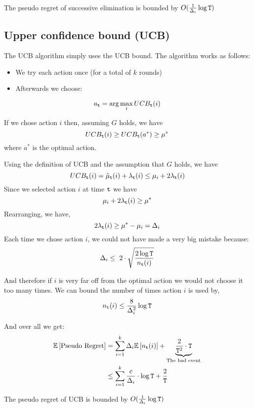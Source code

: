 \begin{theorem}
The pseudo regret of successive elimination is bounded by $O(\frac{1}{\Delta_{i}}\log {\tt T})$
\end{theorem}

\subsection{Upper confidence bound (UCB)}

The UCB algorithm simply uses the UCB bound. The algorithm works as
follows:
\begin{itemize}
\item We try each action once (for a total of $k$ rounds)
\item Afterwards we choose:
\end{itemize}
\[
a_{{\tt t}}=\arg\max_{i}UCB_{{\tt t}}(i)
\]

If we chose action $i$ then, assuming $G$ holds, we have
\[
UCB_{{\tt t}}(i)  \ge  UCB_{{\tt t}}(a^*)\geq\mu^{*}
\]
where $a^*$ is the optimal action.

Using the definition of UCB and the assumption that $G$ holds, we
have
\[
UCB_{{\tt t}}(i)=\hat{\mu}_{{\tt t}}(i)+\lambda_{{\tt t}}(i)\le\mu_{i}+2\lambda_{{\tt t}}(i)
\]
Since we selected action $i$ at time ${\tt t}$ we have
\[
\mu_{i}+2\lambda_{{\tt t}}(i)\ge\mu^{*}
\]
Rearranging, we have,
\[
2\lambda_{{\tt t}}(i)\ge\mu^{*}-\mu_{i}=\Delta_{i}
\]
Each time we chose action $i$, we could not have made a very big
mistake because:
\[
\Delta_{i}\leq\text{ }2\cdot\sqrt{\frac{2\log {\tt T}}{n_{{\tt t}}(i)}}
\]

And therefore if $i$ is very far off from the optimal action we
would not choose it too many times. We can bound the number of times
action $i$ is used by,
\[
n_{{\tt t}}(i)\leq\frac{8}{\Delta_{i}^{2}}\log {\tt T}
\]

And over all we get:
\begin{align*}
\mathbb{E}\left[\text{Pseudo Regret}\right] & =
\sum_{i=1}^{k}\Delta_{i}\mathbb{E}\left[n_{{\tt t}}(i)\right]+\underbrace{\frac{2}{{\tt T}^{2}}\cdot
{\tt T}}_{\text{The bad event}}
\\
 & \le  \sum_{i=1}^{k}\frac{c}{\Delta_{i}}\cdot\log {\tt T}+\frac{2}{{\tt T}}
\end{align*}

\begin{theorem}
The pseudo regret of UCB is bounded by $O(\frac{1}{\Delta_{i}}\log {\tt T})$
\end{theorem}

